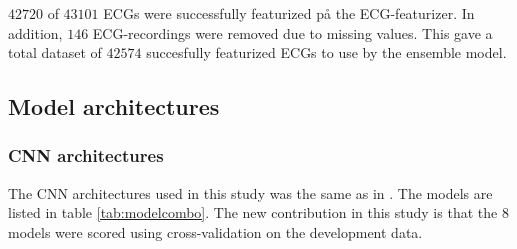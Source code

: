 $42 720$ of $43101$ ECGs were successfully featurized på the ECG-featurizer. In addition, $146$ ECG-recordings were removed due to missing values. This gave a total dataset of $42574$ succesfully featurized ECGs to use by the ensemble model.


\subsection{Model architectures}
\subsubsection{CNN architectures}\hfill \break
The CNN architectures used in this study was the same as in \cite{bjorn-jostein_singstad_classifying_2020}. The models are listed in table \ref{tab:modelcombo}. The new contribution in this study is that the $8$ models were scored using cross-validation on the development data. \newline\newline

\vspace{4 mm}
\begin{table}[!htb]
        \centering
        \caption{The eight CNN models developed in \cite{bjorn-jostein_singstad_classifying_2020} and used in this study}
                \label{tab:modelcombo}
\end{table}
\vspace{4 mm}
\newline

